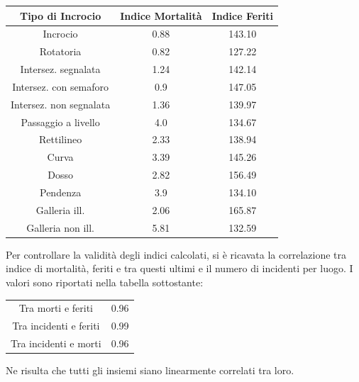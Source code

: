 \documentclass[a4paper]{report}
\begin{document}
\begin{center}
    \def\arraystretch{1.5}%
    \begin{tabular}{ |c|c|c| } 
    \hline
    Tipo di Incrocio & Indice Mortalità & Indice Feriti \\ 
    \hline
    \rowcolor{TableGray}
    Incrocio                & 0.88 & 143.10 \\
    Rotatoria               & 0.82 & 127.22 \\
    \rowcolor{TableGray}
    Intersez. segnalata     & 1.24 & 142.14 \\
    Intersez. con semaforo  & 0.9 & 147.05 \\
    \rowcolor{TableGray}
    Intersez. non segnalata & 1.36 & 139.97\\
    Passaggio a livello     & 4.0 & 134.67\\
    \rowcolor{TableGray}
    Rettilineo              & 2.33 & 138.94\\
    Curva                   & 3.39 & 145.26\\
    \rowcolor{TableGray}
    Dosso                   & 2.82 & 156.49\\
    Pendenza                & 3.9 & 134.10\\
    \rowcolor{TableGray}
    Galleria ill.           & 2.06 & 165.87\\
    Galleria non ill.       & 5.81 & 132.59\\
    \hline
    \end{tabular}
\end{center}

Per controllare la validità degli indici calcolati, si è ricavata la correlazione tra indice di 
mortalità, feriti e tra questi ultimi e il numero di incidenti per luogo.
I valori sono riportati nella tabella sottostante: 

\begin{center}
    \def\arraystretch{1.5}%
    \begin{tabular}{ |c|c| }
        \hline
        \rowcolor{TableGray}
        Tra morti e feriti      & 0.96 \\ 
        Tra incidenti e feriti  & 0.99 \\
        \rowcolor{TableGray}
        Tra incidenti e morti   & 0.96 \\
        \hline
    \end{tabular}
\end{center}

Ne risulta che tutti gli insiemi siano linearmente correlati tra loro. 
\end{document}
